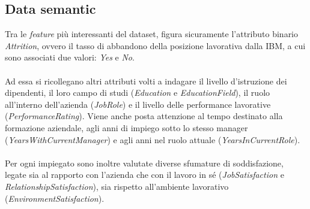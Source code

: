 \subsection{Data semantic}
Tra le \textit{\textit{feature}} più interessanti del dataset, figura sicuramente l'attributo binario \textit{Attrition}, ovvero il tasso di abbandono della posizione lavorativa dalla IBM, a cui sono associati due valori: \textit{Yes} e \textit{No}. \\\\Ad essa si ricollegano altri attributi volti a indagare il livello d’istruzione dei dipendenti, il loro campo di studi (\textit{Education} e \textit{EducationField}), il ruolo all’interno dell’azienda (\textit{JobRole}) e il livello delle performance lavorative (\textit{PerformanceRating}). Viene anche posta attenzione al tempo destinato alla formazione aziendale, agli anni di impiego sotto lo stesso manager (\textit{YearsWithCurrentManager}) e agli anni nel ruolo attuale ({\textit{YearsInCurrentRole}}). \\\\Per ogni impiegato sono inoltre valutate diverse sfumature di soddisfazione, legate sia al rapporto con l’azienda che con il lavoro in sé (\textit{JobSatisfaction} e \textit{RelationshipSatisfaction}), sia rispetto all'ambiente lavorativo (\textit{EnvironmentSatisfaction}).
